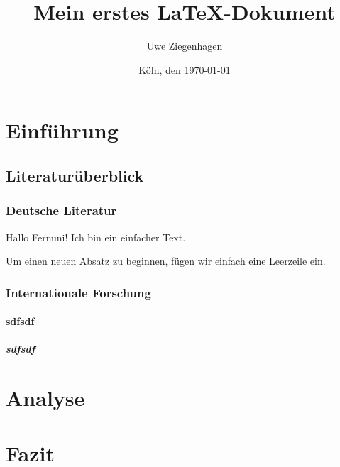 \documentclass[12pt,ngerman,parskip=half]{scrartcl}
\author{Uwe Ziegenhagen}
\title{Mein erstes LaTeX-Dokument}
\date{Köln, den \today} %
\begin{document}
\maketitle

\tableofcontents

\section{Einführung}
\subsection{Literaturüberblick}
\subsubsection{Deutsche Literatur}
Hallo Fernuni!
Ich bin ein einfacher Text.

Um einen neuen Absatz zu beginnen, fügen wir einfach eine Leerzeile ein.

\blindtext

\subsubsection{Internationale Forschung}

\blindtext

\paragraph{sdfsdf} \blindtext

\subparagraph{sdfsdf} \blindtext


\section{Analyse}

\blindtext[205]


\section{Fazit}

\blindtext
\end{document}
